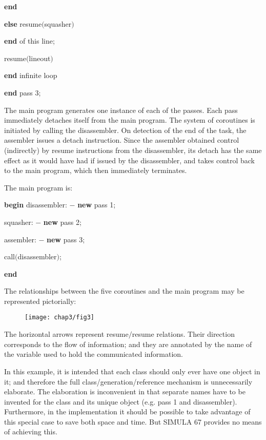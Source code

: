 \quad \quad \quad \quad \quad \quad \textbf{end}

\quad \quad \quad \quad \quad \quad \textbf{else} resume$($squasher$)$

\quad \quad \quad \quad \quad \quad \textbf{end} of this line;

\quad \quad \quad \quad resume$($lineout$)$

\quad \quad \quad \textbf{end} infinite loop

\quad \textbf{end} pass 3;

The main program generates one instance of each of the passes. Each pass immediately detaches itself from the main program. The system of coroutines is initiated by calling the disassembler. On detection of the end of the task, the assembler issues a detach instruction. Since the assembler obtained control (indirectly) by resume instructions from the disassembler, its detach has the same effect as it would have had if issued by the disassembler, and takes control back to the main program, which then immediately terminates.

The main program is:

\quad \textbf{begin} disassembler: $-$ \textbf{new} pass 1;

\quad \quad squasher: $-$ \textbf{new} pass 2;

\quad \quad assembler: $-$ \textbf{new} pass 3;

\quad \quad call$($disassembler$)$;

\quad \textbf{end}

The relationships between the five coroutines and the main program may be represented pictorially:

\begin{figure}[h]
	\centering
	\texttt{[image: chap3/fig3]}
\end{figure}

\noindent
The horizontal arrows represent resume$/$resume relations. Their direction corresponds to the flow of information; and they are annotated by the name of the variable used to hold the communicated information.

In this example, it is intended that each class should only ever have one object in it; and therefore the full class/generation/reference mechanism is unnecessarily elaborate. The elaboration is inconvenient in that separate names have to be invented for the class and its unique object (e.g. pass 1 and disassembler). Furthermore, in the implementation it should be possible to take advantage of this special case to save both space and time. But SIMULA 67 provides no means of achieving this.

